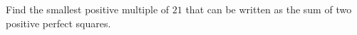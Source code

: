 Find the smallest positive multiple of $21$ that can be written as the sum of two positive perfect squares.
